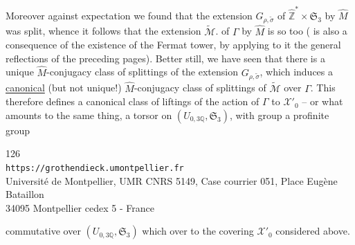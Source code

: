 Moreover against  expectation we found that the extension $G_{\rho,\widetilde\sigma}$ of $\widehat{\mathbb Z}^{*}\times\mathfrak S_3$ by $\widehat M$ was split, whence it follows that  the extension $\widetilde{\mathcal M}$. of $\Gamma$ by $\widehat M$ is so too (  is also a consequence of the existence of the Fermat tower, by applying to it the general reflections of the preceding pages). Better still, we have seen that there is a unique $\widehat M$-conjugacy class of splittings of the extension $G_{\rho,\widetilde\sigma}$, which induces a \uline{canonical} (but not unique!) $\widehat M$-conjugacy class of  splittings of $\widetilde{\mathcal M}$ over $\Gamma$. This therefore defines a canonical  class of liftings of the action of $\Gamma$  to $\mathcal X'_0$ -- or what amounts to the same thing, a torsor on $(U_{0,3\mathbb Q},\mathfrak S_3)$, with group a profinite group



\begin{center}
\small
126\\
\texttt{https://grothendieck.umontpellier.fr}\\
Université de Montpellier, UMR CNRS 5149, Case courrier 051, Place Eugène Bataillon\\
34095 Montpellier cedex 5 - France
\end{center}


commutative over $(U_{0,3\mathbb Q},\mathfrak S_3)$ which over   to the covering $\mathcal X'_0$ considered above.

